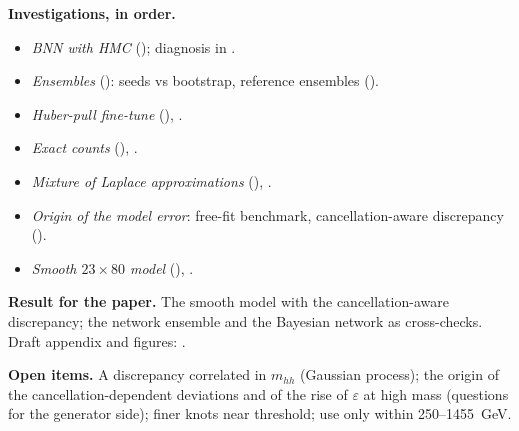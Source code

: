 \noindent\textbf{Investigations, in order.}
\begin{itemize}[leftmargin=1.2em]
  \item \emph{BNN with HMC} (); diagnosis in .
  \item \emph{Ensembles} (): seeds vs bootstrap, reference ensembles ().
  \item \emph{Huber-pull fine-tune} (), .
  \item \emph{Exact counts} (), .
  \item \emph{Mixture of Laplace approximations} (), .
  \item \emph{Origin of the model error}: free-fit benchmark, cancellation-aware discrepancy ().
  \item \emph{Smooth $23\times80$ model} (), .
\end{itemize}

\noindent\textbf{Result for the paper.} The smooth model with the cancellation-aware
discrepancy; the network ensemble and the Bayesian network as cross-checks. Draft appendix and
figures: .

\noindent\textbf{Open items.} A discrepancy correlated in $m_{hh}$ (Gaussian process); the
origin of the cancellation-dependent deviations and of the rise of $\varepsilon$ at high mass
(questions for the generator side); finer knots near threshold; use only within 250--1455~GeV.

